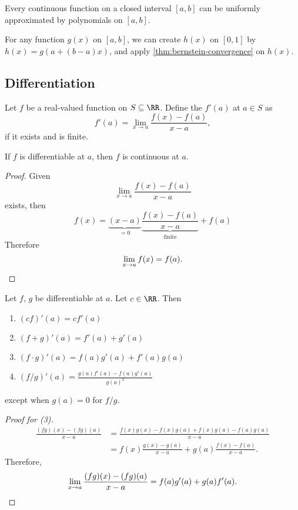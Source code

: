 \documentclass[11pt]{scrartcl}
\numberwithin{equation}{section}
\begin{document}
\begin{theorem}
    \label{thm:weierstrassapproxthm}
    Every continuous function on a closed interval $[a,b]$  can 
    be uniformly approximated by polynomials on $[a,b]$.
\end{theorem}
For any function $g(x)$ on $[a,b]$, we can create $h(x)$ on $[0,1]$ 
by $h(x)=g(a+(b-a)x)$, and apply \cref{thm:bernstein-convergence} on $h(x)$.

\subsection{Differentiation}

\begin{definition}
    Let $f$ be a real-valued function on $S \subseteq \RR$.
    Define the  $f'(a)$ at $a\in S$ as 
    \[
        f'(a) = \lim_{x\rightarrow a}\frac{f(x)-f(a)}{x-a},
    \]
    if it exists and is finite.
\end{definition}
\begin{theorem}
    If $f$ is differentiable at $a$, then $f$ is continuous at $a$.
\end{theorem}
\begin{proof}
    Given 
    \[
        \lim_{x\rightarrow a}\frac{f(x)-f(a)}{x-a}
    \]
    exists, then 
    \[
        f(x) = \underbrace{(x-a)}_{=0}\underbrace{\frac{f(x)-f(a)}{x-a}}_{\text{finite}} + f(a)
    \]
    Therefore 
    \[
        \lim_{x\rightarrow a}f(x) = f(a).\qedhere
    \]
\end{proof}
\begin{proposition}
    Let $f$, $g$ be differentiable at $a$. Let $c\in \RR$.
    Then 
    \begin{enumerate}
        \item $(cf)'(a) = cf'(a)$
        \item $(f+g)'(a) = f'(a) + g'(a)$
        \item $(f\cdot g)'(a) = f(a)g'(a)+f'(a)g(a)$
        \item $(f/g)'(a) = \frac{g(a)f'(a)-f(a)g'(a)}{g(a)^2}$
    \end{enumerate}
    except when $g(a)=0$ for $f/g$.
\end{proposition}
\begin{proof}
    [Proof for (3)]
    \begin{align*}
        \frac{(fg)(x)-(fg)(a)}{x-a} &= \frac{f(x)g(x)-f(x)g(a)+f(x)g(a)-f(a)g(a)}{x-a} \\
        &= f(x)\frac{g(x)-g(a)}{x-a} + g(a)\frac{f(x)-f(a)}{x-a}.
    \end{align*}
    Therefore, 
    \[
        \lim_{x\rightarrow a}\frac{(fg)(x)-(fg)(a)}{x-a} = f(a)g'(a) + g(a)f'(a). \qedhere
    \]
\end{proof}
\end{document}

